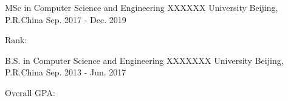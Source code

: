 


\begin{cventries}


\cventry
{MSc in Computer Science and Engineering} %
{XXXXXX University} %
{Beijing, P.R.China} %
{Sep. 2017 - Dec. 2019} %
{ %
\begin{cvitems}
    Rank: 
\end{cvitems}
}

\vspace{-4mm}

\cventry
{B.S. in Computer Science and Engineering} %
{XXXXXXX University} %
{Beijing, P.R.China} %
{Sep. 2013 - Jun. 2017} %
{ %
\begin{cvitems}
\item {
	Overall GPA: 
    }
\end{cvitems}
}


\end{cventries}
